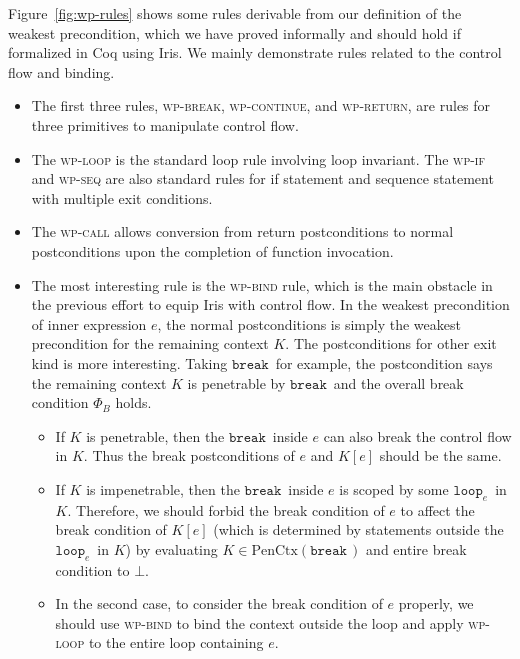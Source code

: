 \documentclass{article}
\numberwithin{algorithm}{section}
\newcommand{\cloop}[1]{\texttt{loop}_{#1}\,}
\newcommand{\cbreak}{\texttt{break}\,}
\newcommand{\pure}[1]{\text{PenCtx}(#1)}
\begin{document}
Figure~\ref{fig:wp-rules} shows some rules derivable from our definition of the weakest precondition, which we have proved informally and should hold if formalized in Coq using Iris.
We mainly demonstrate rules related to the control flow and binding.

\begin{itemize}
    \item The first three rules, \textsc{wp-break}, \textsc{wp-continue}, and \textsc{wp-return}, are rules for three primitives to manipulate control flow.
    \item The \textsc{wp-loop} is the standard loop rule involving loop invariant.
    The \textsc{wp-if} and \textsc{wp-seq} are also standard rules for if statement and sequence statement with multiple exit conditions.
    \item The \textsc{wp-call} allows conversion from return postconditions to normal postconditions upon the completion of function invocation.
    \item The most interesting rule is the \textsc{wp-bind} rule, which is the main obstacle in the previous effort to equip Iris with control flow.
    In the weakest precondition of inner expression $e$, the normal postconditions is simply the weakest precondition for the remaining context $K$.
    The postconditions for other exit kind is more interesting. Taking $\cbreak\!$ for example, the postcondition says the remaining context $K$ is penetrable by $\cbreak\!$ and the overall break condition $\Phi_B$ holds. \begin{itemize}
        \item If $K$ is penetrable, then the $\cbreak\!$ inside $e$ can also break the control flow in $K$. Thus the break postconditions of $e$ and $K[e]$ should be the same.
        \item If $K$ is impenetrable, then the $\cbreak\!$ inside $e$ is scoped by some $\cloop{e}\!$ in $K$. Therefore, we should forbid the break condition of $e$ to affect the break condition of $K[e]$ (which is determined by statements outside the $\cloop{e}\!$ in $K$) by evaluating $K \in \pure{\cbreak\!}$ and entire break condition to $\bot$.
        \item In the second case, to consider the break condition of $e$ properly, we should use \textsc{wp-bind} to bind the context outside the loop and apply \textsc{wp-loop} to the entire loop containing $e$.
    \end{itemize}
\end{itemize}
\end{document}

